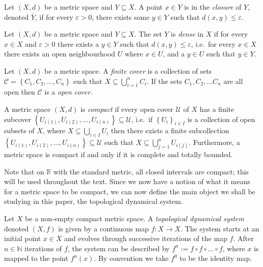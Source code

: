 \begin{defn}[Closure] \label{defn:closure}
    Let $(X, d)$ be a metric space and $Y \subseteq X$. A point $x \in Y$ is in the \emph{closure} of $Y$, denoted $\overline{Y}$, if for every $\varepsilon > 0$, there exists some $y \in Y$ such that $d(x, y) \leq \varepsilon$.
\end{defn}


\begin{defn} \label{defn:dense}
    Let $(X, d)$ be a metric space and $Y \subseteq X$. The set $Y$ is \emph{dense} in $X$ if for every $x \in X$ and $\varepsilon > 0$ there exists a $y \in Y$ such that $d(x, y) \leq \varepsilon$, i.e.\ for every $x \in X$ there exists an open neighbourhood $U$ where $x \in U$, and a $y \in U$ such that $y \in Y$.
\end{defn}

\begin{defn} \label{defn:cover}
    Let $(X, d)$ be a metric space. A \emph{finite cover} is a collection of sets $\mathcal{C} = \left\lbrace C_1, C_2, \dots, C_n \right\rbrace$ such that $X \subseteq \bigcup_{i = 1}^nC_i$. If the sets $C_1, C_2, \dots C_n$ are all open then $\mathcal{C}$ is a \emph{open cover}.
\end{defn}

\begin{defn} \label{defn:compact}
    A metric space $(X, d)$ is \emph{compact} if every open cover $\mathcal{U}$ of $X$ has a finite subcover $\left\lbrace U_{i(1)}, U_{i(2)}, \dots, U_{i(n)} \right\rbrace \subseteq \mathcal{U}$, i.e.\ if $\left\lbrace U_i \right\rbrace_{i\in I}$ is a collection of open subsets of $X$, where $X \subseteq \bigcup_{i \in I}U_i$ then there exists a finite subcollection $\left\lbrace U_{i(1)}, U_{i(2)}, \dots, U_{i(n)} \right\rbrace \subseteq \mathcal{U}$ such that $X \subseteq \bigcup_{j = 1}^{n}U_{i(j)}$. Furthermore, a metric space is compact if and only if it is complete and totally bounded.
\end{defn}

Note that on $\mathbb{R}$ with the standard metric, all closed intervals are compact; this will be used throughout the text. Since we now have a notion of what it means for a metric space to be compact, we can now define the main object we shall be studying in this paper, the topological dynamical system.

\begin{defn} \label{defn:topological-dynamical-system}
    Let $X$ be a non-empty compact metric space. A \emph{topological dynamical system} denoted $(X, f)$ is given by a continuous map $f: X \to X$. The system starts at an initial point $x \in X$ and evolves through successive iterations of the map $f$. After $n \in \mathbb{N}$ iterations of $f$, the system can be described by $f^n := f \circ f \circ \dots \circ f$, where $x$ is mapped to the point $f^n(x)$. By convention we take $f^0$ to be the identity map.
\end{defn}

